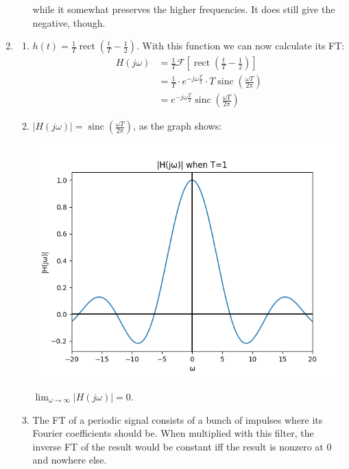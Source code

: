 \documentclass[12pt]{article}
\newcommand{\rect}{\operatorname{rect}}
\newcommand{\sinc}{\operatorname{sinc}}
\newcommand{\ft}[1]{\mathcal{F}\left[#1\right]}
\begin{document}
\begin{enumerate}
\begin{enumerate}
                        while it somewhat preserves the higher frequencies.
                        It does still give the negative, though.
            \end{enumerate}
      \item \begin{enumerate}
                  \item $h(t)=\frac{1}{T}\rect\left(\frac{t}{T}-\frac{1}{2}\right)$.
                        With this function we can now calculate its FT:
                        \begin{align*}
                              H(j\omega)
                               & = \frac{1}{T}\ft{\rect\left(\frac{t}{T}-\frac{1}{2}\right)}                                \\
                               & = \frac{1}{T} \cdot e^{-j\omega\frac{T}{2}} \cdot T\sinc\left(\frac{\omega T}{2\pi}\right) \\
                               & = \boxed{e^{-j\omega\frac{T}{2}}\sinc\left(\frac{\omega T}{2\pi}\right)}
                        \end{align*}
                  \item $|H(j\omega)|=\sinc\left(\frac{\omega T}{2\pi}\right)$, as the graph shows:

                        \includegraphics[width=12cm]{img/hw6/mag_plot}

                        $\lim_{\omega \to \infty} |H(j\omega)| = \boxed{0}$.
                  \item The FT of a periodic signal consists of a bunch of impulses
                        where its Fourier coefficients should be.
                        When multiplied with this filter, the inverse FT of the result
                        would be constant iff the result is nonzero at $0$ and nowhere else.


\end{enumerate}
\end{enumerate}
\end{document}
